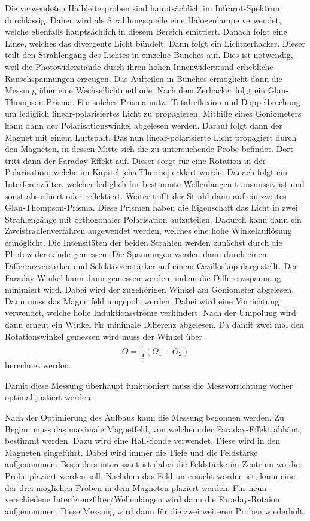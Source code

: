 Die verwendeten Halbleiterproben  sind hauptsächlich im Infrarot-Spektrum durchlässig. Daher wird als Strahlungsquelle eine Halogenlampe verwendet, welche ebenfalls 
hauptsächlich in diesem Bereich emittiert. Danach folgt eine Linse, welches das divergente Licht bündelt.
Dann folgt ein Lichtzerhacker. Dieser teilt den Strahlengang des Lichtes in einzelne Bunches auf. Dies ist notwendig,
weil die Photowiderstände durch ihren hohen Innenwiderstand erhebliche Rauschspannungen erzeugen. Das Aufteilen in Bunches ermöglicht dann die Messung über eine Wechsellichtmethode.
Nach dem Zerhacker folgt ein Glan-Thompson-Prisma. Ein solches Prisma nutzt Totalreflexion und Doppelbrechung um lediglich linear-polarisiertes Licht zu propagieren. 
Mithilfe eines Goniometers kann dann der Polarisationswinkel abgelesen 
werden. Darauf folgt dann der Magnet mit einem Luftspalt. Das nun linear-polarisierte Licht propagiert durch den Magneten, in dessen Mitte sich die zu untersuchende Probe befindet. Dort 
tritt dann der Faraday-Effekt auf. Dieser sorgt für eine Rotation in der Polarisation, welche im Kapitel \ref{cha:Theorie} erklärt wurde. Danach folgt ein Interferenzfilter, welcher 
lediglich für bestimmte Wellenlängen transmissiv ist und sonst absorbiert oder reflektiert. Weiter trifft der Strahl dann auf ein zweites Glan-Thompson-Prisma. Diese Prismen haben 
die Eigenschaft das Licht in zwei Strahlengänge mit orthogonaler Polarisation aufzuteilen. Dadurch kann dann ein Zweistrahlenverfahren angewendet werden, welches eine hohe Winkelauflösung 
ermöglicht. Die Intensitäten der beiden Strahlen werden zunächst durch die Photowiderstände gemessen. Die Spannungen werden dann durch einen Differenzversärker und Selektivverstärker 
auf einem Oszilloskop dargestellt. Der Faraday-Winkel kann dann gemessen werden, indem die Differenzspannung minimiert wird. Dabei wird der zugehörigen Winkel am Goniometer abgelesen. 
Dann muss das Magnetfeld umgepolt werden. Dabei wird eine Vorrichtung verwendet, welche hohe Induktionsströme verhindert. Nach der Umpolung wird dann erneut ein Winkel für minimale 
Differenz abgelesen. Da damit zwei mal den Rotationswinkel gemessen wird muss der Winkel über 
\begin{equation}
              \label{eqn:theta}
              \Theta = \frac{1}{2}\left(\Theta_1 - \Theta_2\right)
\end{equation}
berechnet werden.

Damit diese Messung überhaupt funktioniert muss die Messvorrichtung vorher optimal justiert werden. 

Nach der Optimierung des Aufbaus kann die Messung begonnen werden. Zu Beginn muss das maximale Magnetfeld, von welchem der Faraday-Effekt abhänt, bestimmt werden. Dazu wird eine 
Hall-Sonde verwendet. Diese wird in den Magneten eingeführt. Dabei wird immer die Tiefe und die Feldstärke aufgenommen. Besonders interessant ist dabei die Feldstärke im Zentrum
wo die Probe plaziert werden soll. Nachdem das Feld untersucht worden ist, kann eine der drei möglichen  Proben in dem Magneten plaziert werden. Für neun verschiedene 
Interferenzfilter/Wellenlängen wird dann die Faraday-Rotaion aufgenommen. Diese Messung wird dann für die zwei weiteren 
Proben wiederholt.   